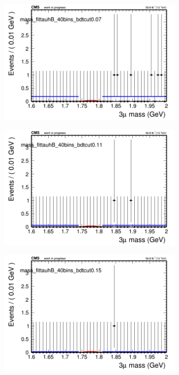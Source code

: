 \begin{figure}[H]
\begin{subfigure}{0.2\textwidth}
        \caption{}
    \end{subfigure}
    \begin{subfigure}{0.2\textwidth}
        \includegraphics[width=\textwidth]{flat_fit/plots/tauhB/massfit_tauhB_40bins_bdtcut0.07.png}
        \caption{}
    \end{subfigure}
    \begin{subfigure}{0.2\textwidth}
        \includegraphics[width=\textwidth]{flat_fit/plots/tauhB/massfit_tauhB_40bins_bdtcut0.11.png}
        \caption{}
    \end{subfigure}
    \begin{subfigure}{0.2\textwidth}
        \includegraphics[width=\textwidth]{flat_fit/plots/tauhB/massfit_tauhB_40bins_bdtcut0.15.png}

\end{subfigure}
\end{figure}
